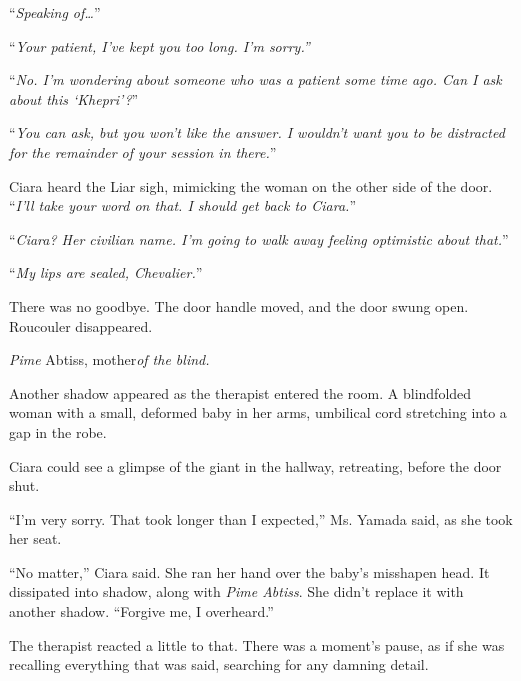 ``\emph{Speaking of\ldots}''



``\emph{Your patient, I've kept you too long.  I'm sorry.''}



``\emph{No.  I'm wondering about someone who was a patient some time ago.  Can I ask about this `Khepri'?}''



``\emph{You can ask, but you won't like the answer.  I wouldn't want you to be distracted for the remainder of your session in there.}''



Ciara heard the Liar sigh, mimicking the woman on the other side of the door.  ``\emph{I'll take your word on that.  I should get back to Ciara.}''



``\emph{Ciara?  Her civilian name.  I'm going to walk away feeling optimistic about that.}''



``\emph{My lips are sealed, Chevalier.}''



There was no goodbye.  The door handle moved, and the door swung open.  Roucouler disappeared.



\emph{Pime} Abtiss, mother\emph{of the blind.}



Another shadow appeared as the therapist entered the room.  A blindfolded woman with a small, deformed baby in her arms, umbilical cord stretching into a gap in the robe.



Ciara could see a glimpse of the giant in the hallway, retreating, before the door shut.



``I'm very sorry.  That took longer than I expected,'' Ms. Yamada said, as she took her seat.



``No matter,'' Ciara said.  She ran her hand over the baby's misshapen head.  It dissipated into shadow, along with \emph{Pime Abtiss}.  She didn't replace it with another shadow.  ``Forgive me, I overheard.''



The therapist reacted a little to that.  There was a moment's pause, as if she was recalling everything that was said, searching for any damning detail.



